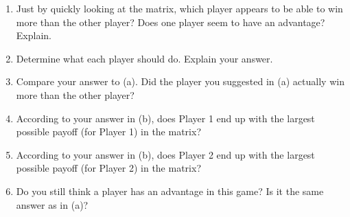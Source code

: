 \begin{enumerate}
\begin{tabular}{l|r|c|c|c|}
\end{tabular}
\begin{enumerate}
\item Just by quickly looking at the matrix, which player appears to be able to win more than the other player? Does one player seem to have an advantage? Explain.
\item Determine what each player should do. Explain your answer.
\item Compare your answer to (a). Did the player you suggested in (a) actually win more than the other player?
\item According to your answer in (b), does Player 1 end up with the largest possible payoff (for Player 1) in the matrix?
\item According to your answer in (b), does Player 2 end up with the largest possible payoff (for Player 2) in the matrix?
\item Do you still think a player has an advantage in this game? Is it the same answer as in (a)?

\end{enumerate}

\vspace{.5in}

   
\end{enumerate}
 